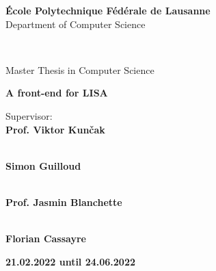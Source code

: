 \begin{center}
{\LARGE \textbf{École Polytechnique Fédérale de Lausanne}} \\
\vspace{0.2cm}
{\Large {Department of Computer Science}} \\
\vspace{1cm}

 \\
\vspace{0.8cm}

{\Large {Master Thesis in Computer Science}} \\
\vspace{1cm}

{\LARGE \textbf{A front-end for LISA}} \\
\vspace{1cm}

\end{center}

\begin{multicols}{2}
\noindent \large{Supervisor:} \\
\large{\textbf{Prof. Viktor Kunčak}} \\
\vspace{0.1cm}

 \\
\large{\textbf{Simon Guilloud}} \\
\vspace{0.1cm}

 \\
\large{\textbf{Prof. Jasmin Blanchette}} \\
\vspace{0.1cm}
\columnbreak

 \\
\large{\textbf{Florian Cassayre}} \\
\end{multicols}
\vspace{2cm}

\begin{center}
    \large{\textbf{21.02.2022 until 24.06.2022}}
\end{center}
